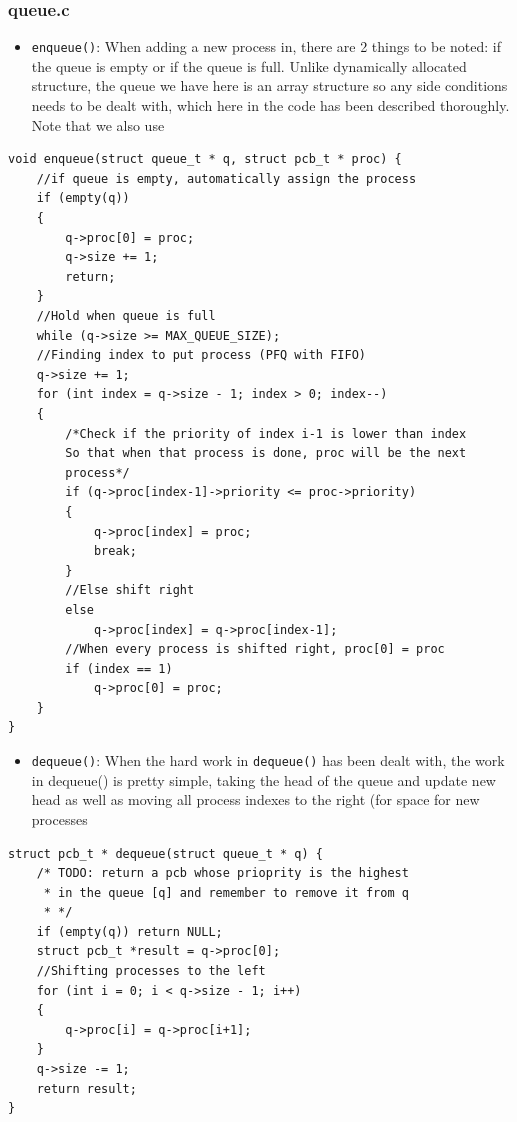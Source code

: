 \documentclass[a4paper]{article}
\numberwithin{equation}{section}
\begin{document}
\subsubsection{queue.c}
\begin{itemize}
    \item \texttt{enqueue()}: When adding a new process in, there are 2 things to be noted: if the queue is empty or if the queue is full. Unlike dynamically allocated structure, the queue we have here is an array structure so any side conditions needs to be dealt with, which here in the code has been described thoroughly. 
    Note that we also use
\end{itemize}
\begin{mdframed}[leftline=true,rightline=true,backgroundcolor=blue!10,nobreak=true]
  \begin{verbatim}
void enqueue(struct queue_t * q, struct pcb_t * proc) {
	//if queue is empty, automatically assign the process
	if (empty(q)) 
	{
		q->proc[0] = proc;
		q->size += 1;
		return;
	}
	//Hold when queue is full
	while (q->size >= MAX_QUEUE_SIZE);
	//Finding index to put process (PFQ with FIFO)
	q->size += 1;
	for (int index = q->size - 1; index > 0; index--)
	{
		/*Check if the priority of index i-1 is lower than index
		So that when that process is done, proc will be the next 
		process*/
		if (q->proc[index-1]->priority <= proc->priority)
		{
			q->proc[index] = proc;
			break;
		}
		//Else shift right
		else
			q->proc[index] = q->proc[index-1];
		//When every process is shifted right, proc[0] = proc
		if (index == 1)
			q->proc[0] = proc;
	}
}
  \end{verbatim}
\end{mdframed}

\begin{itemize}
    \item \texttt{dequeue()}: When the hard work in \texttt{dequeue()} has been dealt with, the work in dequeue() is pretty simple, taking the head of the queue and update new head as well as moving all process indexes to the right (for space for new processes
\end{itemize}
\begin{mdframed}[leftline=true,rightline=true,backgroundcolor=blue!10,nobreak=true]
  \begin{verbatim}
struct pcb_t * dequeue(struct queue_t * q) {
	/* TODO: return a pcb whose prioprity is the highest
	 * in the queue [q] and remember to remove it from q
	 * */
	if (empty(q)) return NULL;
	struct pcb_t *result = q->proc[0];
	//Shifting processes to the left
	for (int i = 0; i < q->size - 1; i++)
	{
		q->proc[i] = q->proc[i+1];
	}
	q->size -= 1;
	return result;
}
  \end{verbatim}
\end{mdframed}
\end{document}
